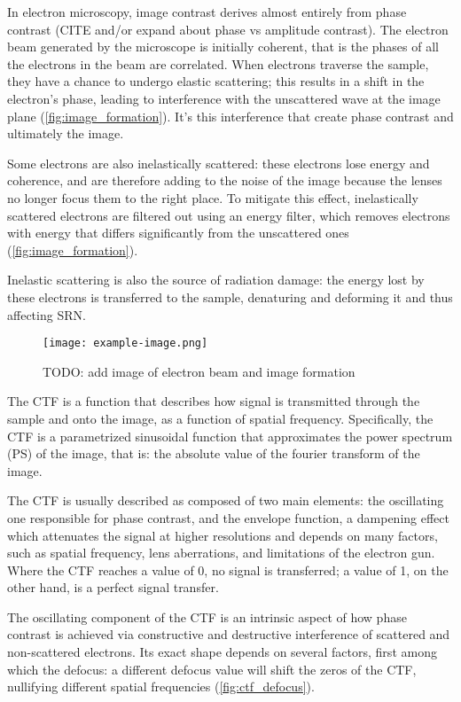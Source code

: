 In electron microscopy, image contrast derives almost entirely from phase contrast (CITE and/or expand about phase vs amplitude contrast).
The electron beam generated by the microscope is initially coherent, that is the phases of all the electrons in the beam are correlated.
When electrons traverse the sample, they have a chance to undergo elastic scattering; this results in a shift in the electron's phase, leading to interference with the unscattered wave at the image plane (\autoref{fig:image_formation}).
It's this interference that create phase contrast and ultimately the image.

Some electrons are also inelastically scattered: these electrons lose energy and coherence, and are therefore adding to the noise of the image because the lenses no longer focus them to the right place.
To mitigate this effect, inelastically scattered electrons are filtered out using an energy filter, which removes electrons with energy that differs significantly from the unscattered ones (\autoref{fig:image_formation}).

Inelastic scattering is also the source of radiation damage: the energy lost by these electrons is transferred to the sample, denaturing and deforming it and thus affecting SRN.

\begin{figure}[ht]
    \centering
    \texttt{[image: example-image.png]}
    \caption[Image formation in cryo-EM]{TODO: add image of electron beam and image formation}
    \label{fig:image_formation}
\end{figure}

The CTF is a function that describes how signal is transmitted through the sample and onto the image, as a function of spatial frequency.
Specifically, the CTF is a parametrized sinusoidal function that approximates the power spectrum (PS) of the image, that is: the absolute value of the fourier transform of the image.

The CTF is usually described as composed of two main elements: the oscillating one responsible for phase contrast, and the envelope function, a dampening effect which attenuates the signal at higher resolutions and depends on many factors, such as spatial frequency, lens aberrations, and limitations of the electron gun.
Where the CTF reaches a value of \num{0}, no signal is transferred; a value of \num{1}, on the other hand, is a perfect signal transfer.

The oscillating component of the CTF is an intrinsic aspect of how phase contrast is achieved via constructive and destructive interference of scattered and non-scattered electrons.
Its exact shape depends on several factors, first among which the defocus: a different defocus value will shift the zeros of the CTF, nullifying different spatial frequencies (\autoref{fig:ctf_defocus}).

